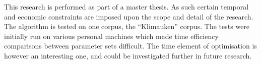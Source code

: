 This research is performed as part of a master thesis. As such certain temporal and economic constraints are imposed upon the scope and detail of the research. The algorithm is tested on one corpus, the ``Klimauken'' corpus. The tests were initially run on various personal machines which made time efficiency comparisons between parameter sets difficult. The time element of optimisation is however an interesting one, and could be investigated further in future research.